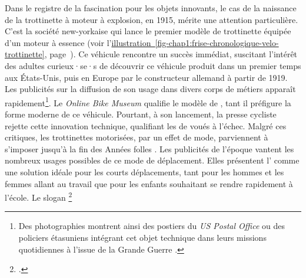 \begin{refsegment}
Dans le registre de la fascination pour les objets innovants, le cas de la naissance de la trottinette à moteur à explosion, en 1915, mérite une attention particulière. C’est la société new-yorkaise  qui lance le premier modèle de trottinette équipée d’un moteur à essence (voir l'\hyperref[fig-chap1:frise-chronologique-velo-trottinette]{illustration~\ref{fig-chap1:frise-chronologique-velo-trottinette}}, page~\pageref{fig-chap1:frise-chronologique-velo-trottinette}). Ce véhicule rencontre un succès immédiat, suscitant l’intérêt des adultes curieux·se·s de découvrir ce véhicule produit dans un premier temps aux États-Unis, puis en Europe par le constructeur allemand  à partir de 1919. Les publicités sur la diffusion de son usage dans divers corps de métiers apparaît rapidement\footnote{
    Des photographies montrent ainsi des postiers du \textsl{US Postal Office} ou des policiers étasuniens intégrant cet objet technique dans leurs missions quotidiennes à l’issue de la Grande Guerre \textcolor{blue}{\autocite{ma_trott_origines_2019}}.
}. Le \textsl{Online Bike Museum} qualifie le modèle  de , tant il préfigure la forme moderne de ce véhicule. Pourtant, à son lancement, la presse cycliste rejette cette innovation technique, qualifiant les  de  voués à l’échec. Malgré ces critiques, les trottinettes motorisées, par un effet de mode, parviennent à s’imposer jusqu’à la fin des Années folles \textcolor{blue}{\autocite{smithsonian_magazine_motorized_2019}}. Les publicités de l’époque vantent les nombreux usages possibles de ce mode de déplacement. Elles présentent l’ comme une solution idéale pour les courts déplacements, tant pour les hommes et les femmes allant au travail que pour les enfants souhaitant se rendre rapidement à l’école. Le slogan \footnote{
     \textcolor{blue}{\autocite{smithsonian_magazine_motorized_2019}}.
}
\end{refsegment}
